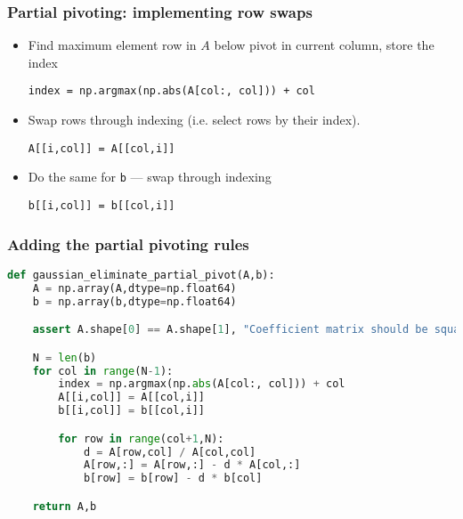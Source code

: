 \begin{frame}[fragile]
  \frametitle{Partial pivoting: implementing row swaps}
  \begin{itemize}[<+->]
    \item Find maximum element row in $A$ below pivot in current column, store the index
    \begin{lstlisting}[numbers=none]
index = np.argmax(np.abs(A[col:, col])) + col 
    \end{lstlisting}
    \item Swap rows through indexing (i.e. select rows by their index).
    \begin{lstlisting}[numbers=none]
A[[i,col]] = A[[col,i]]
    \end{lstlisting}
    \item Do the same for \lstinline$b$ --- swap through indexing
    \begin{lstlisting}[numbers=none]
b[[i,col]] = b[[col,i]]
      \end{lstlisting}
  \end{itemize}
\end{frame}

\begin{frame}[fragile]
  \frametitle{Adding the partial pivoting rules}
  \begin{lstlisting}[language=Python]
def gaussian_eliminate_partial_pivot(A,b):
    A = np.array(A,dtype=np.float64)
    b = np.array(b,dtype=np.float64)

    assert A.shape[0] == A.shape[1], "Coefficient matrix should be square"

    N = len(b)
    for col in range(N-1):
        index = np.argmax(np.abs(A[col:, col])) + col
        A[[i,col]] = A[[col,i]]
        b[[i,col]] = b[[col,i]]

        for row in range(col+1,N):
            d = A[row,col] / A[col,col]
            A[row,:] = A[row,:] - d * A[col,:]
            b[row] = b[row] - d * b[col]

    return A,b
  \end{lstlisting}
\end{frame}

